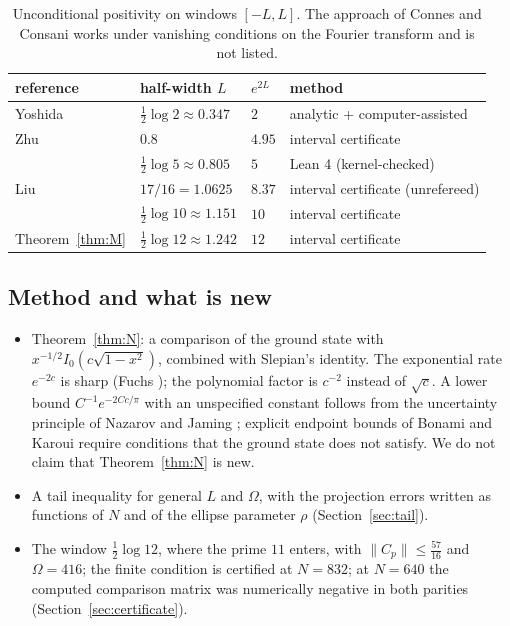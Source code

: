 \documentclass[11pt]{amsart}
\theoremstyle{remark}
\numberwithin{equation}{section}
\begin{document}
\begin{table}[h]
\centering\small
\begin{tabular}{llll}
\toprule
reference & half-width $L$ & $e^{2L}$ & method\\
\midrule
Yoshida \cite{Yoshida1992} & $\frac12\log2\approx0.347$ & $2$ & analytic + computer-assisted\\
Zhu \cite{Zhu2026} & $0.8$ & $4.95$ & interval certificate\\
\cite{MoriLog5} & $\frac12\log5\approx0.805$ & $5$ & Lean 4 (kernel-checked)\\
Liu \cite{Liu2026} & $17/16=1.0625$ & $8.37$ & interval certificate (unrefereed)\\
\cite{MoriVI} & $\frac12\log10\approx1.151$ & $10$ & interval certificate\\
Theorem~\ref{thm:M} & $\frac12\log12\approx1.242$ & $12$ & interval certificate\\
\bottomrule
\end{tabular}
\caption{Unconditional positivity on windows $[-L,L]$. The approach of Connes and Consani \cite{CC20} works under vanishing conditions on the Fourier transform and is not listed.}
\end{table}

\subsection{Method and what is new}
\begin{itemize}
\item Theorem~\ref{thm:N}: a comparison of the ground state with $x^{-1/2}I_0(c\sqrt{1-x^2})$, combined with Slepian's identity. The exponential rate $e^{-2c}$ is sharp (Fuchs \cite{Fuchs64}); the polynomial factor is $c^{-2}$ instead of $\sqrt c$. A lower bound $C^{-1}e^{-2Cc/\pi}$ with an unspecified constant follows from the uncertainty principle of Nazarov and Jaming \cite{Nazarov93,Jaming07}; explicit endpoint bounds of Bonami and Karoui \cite{BK16,BK17} require conditions that the ground state does not satisfy. We do not claim that Theorem~\ref{thm:N} is new.
\item A tail inequality for general $L$ and $\Omega$, with the projection errors written as functions of $N$ and of the ellipse parameter $\rho$ (Section~\ref{sec:tail}).
\item The window $\frac12\log12$, where the prime $11$ enters, with $\|C_p\|\le\frac{57}{16}$ and $\Omega=416$; the finite condition is certified at $N=832$; at $N=640$ the computed comparison matrix was numerically negative in both parities (Section~\ref{sec:certificate}).
\end{itemize}
\end{document}
